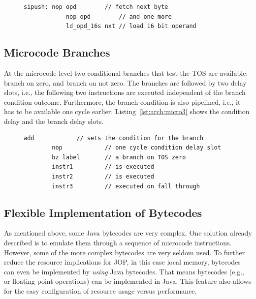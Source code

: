 \begin{figure}
\begin{lstlisting}[caption={Bytecode operand load},
label=lst:arch:micro2]
    sipush: nop opd        // fetch next byte
            nop opd        // and one more
            ld_opd_16s nxt // load 16 bit operand
\end{lstlisting}
\end{figure}

\subsection{Microcode Branches}

At the microcode level two conditional branches that test the TOS are
available:  branch on zero, and  branch on not
zero. The branches are followed by two delay slots, i.e., the
following two instructions are executed independent of the branch
condition outcome. Furthermore, the branch condition is also
pipelined, i.e., it has to be available one cycle earlier.
Listing~\ref{lst:arch:micro3} shows the condition delay and the
branch delay slots.

\begin{figure}
\begin{lstlisting}[caption={Microcode condition delay and branch delay slots},
label=lst:arch:micro3]
        add            // sets the condition for the branch
        nop            // one cycle condition delay slot
        bz label       // a branch on TOS zero
        instr1         // is executed
        instr2         // is executed
        instr3         // executed on fall through
\end{lstlisting}
\end{figure}

\subsection{Flexible Implementation of Bytecodes}
\label{subsec:flex:bc}

As mentioned above, some Java bytecodes are very complex. One
solution already described is to emulate them through a sequence of
microcode instructions. However, some of the more complex bytecodes
are very seldom used. To further reduce the resource implications
for JOP, in this case local memory, bytecodes can even be
implemented by \emph{using} Java bytecodes. That means bytecodes
(e.g.,  or floating point operations) can be implemented
in Java. This feature also allows for the easy configuration of
resource usage versus performance.

